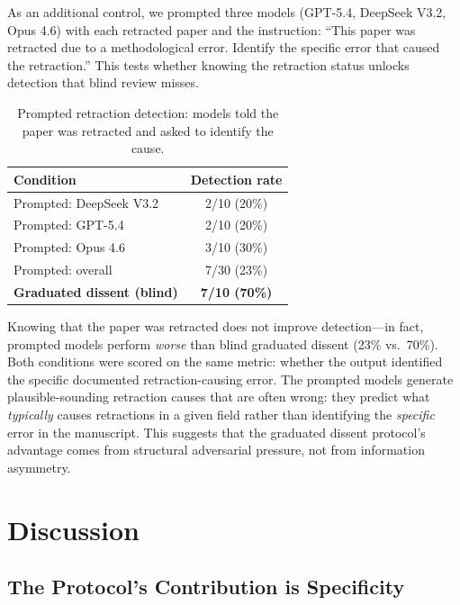 \documentclass[11pt]{article}
\begin{document}
As an additional control, we prompted three models (GPT-5.4, DeepSeek V3.2, Opus 4.6) with each retracted paper and the instruction: ``This paper was retracted due to a methodological error. Identify the specific error that caused the retraction.'' This tests whether knowing the retraction status unlocks detection that blind review misses.

\begin{table}[h]
\centering
\caption{Prompted retraction detection: models told the paper was retracted and asked to identify the cause.}
\label{tab:prompted}
\begin{tabular}{lc}
\toprule
\textbf{Condition} & \textbf{Detection rate} \\
\midrule
Prompted: DeepSeek V3.2 & 2/10 (20\%) \\
Prompted: GPT-5.4 & 2/10 (20\%) \\
Prompted: Opus 4.6 & 3/10 (30\%) \\
Prompted: overall & 7/30 (23\%) \\
\midrule
\textbf{Graduated dissent (blind)} & \textbf{7/10 (70\%)} \\
\bottomrule
\end{tabular}
\end{table}

Knowing that the paper was retracted does not improve detection---in fact, prompted models perform \emph{worse} than blind graduated dissent (23\% vs.\ 70\%). Both conditions were scored on the same metric: whether the output identified the specific documented retraction-causing error. The prompted models generate plausible-sounding retraction causes that are often wrong: they predict what \emph{typically} causes retractions in a given field rather than identifying the \emph{specific} error in the manuscript. This suggests that the graduated dissent protocol's advantage comes from structural adversarial pressure, not from information asymmetry.

\section{Discussion}

\subsection{The Protocol's Contribution is Specificity}
\end{document}
